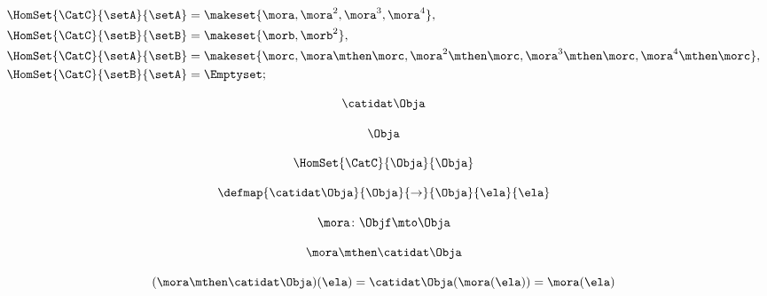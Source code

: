 {\begin{forslides}
        \begin{equation}
            \label{eq:semicats-slides-85}
            \begin{aligned}
                \HomSet{\CatC}{\setA}{\setA} & = \makeset{ \mora, \mora^2, \mora^3, \mora^4 }, \\
                \HomSet{\CatC}{\setB}{\setB} & =  \makeset{ \morb, \morb^2 }, \\
                \HomSet{\CatC}{\setA}{\setB} & =  \makeset{ \morc, \mora \mthen \morc, \mora^2 \mthen \morc, \mora^3 \mthen \morc, \mora^4 \mthen \morc}, \\
                \HomSet{\CatC}{\setB}{\setA} & = \Emptyset;
            \end{aligned}
        \end{equation}

        \begin{equation}
            \label{eq:semicats-slides-86}
            \catidat\Obja
        \end{equation}

        \begin{equation}
            \label{eq:semicats-slides-87}
            \Obja
        \end{equation}

        \begin{equation}
            \label{eq:semicats-slides-88}
            \HomSet{\CatC}{\Obja}{\Obja}
        \end{equation}

        \begin{equation}
            \label{eq:semicats-slides-89}
            \defmap{
                \catidat\Obja
            }{
                \Obja
            }{
                \to
            }{
                \Obja
            }{
                \ela
            }{
                \ela
            }
        \end{equation}

        \begin{equation}
            \label{eq:semicats-slides-90}
            \mora \colon \Objf \mto \Obja
        \end{equation}

        \begin{equation}
            \label{eq:semicats-slides-91}
            \mora \mthen \catidat\Obja
        \end{equation}

        \begin{equation}
            \label{eq:semicats-slides-92}
            (\mora \mthen \catidat\Obja)(\ela)
            = \catidat\Obja(\mora (\ela)) = \mora (\ela)
        \end{equation}


\end{forslides}}
